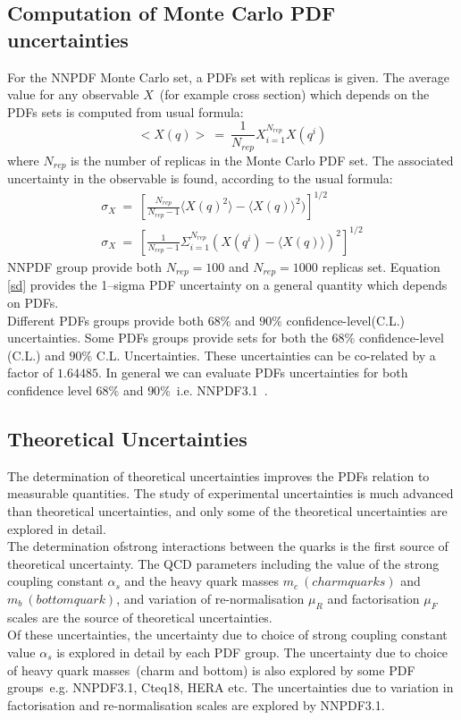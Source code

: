 \subsection{Computation of Monte Carlo PDF uncertainties}
For the NNPDF Monte Carlo set, a PDFs set with replicas is given. The average value for any observable $X$~(for example cross section) which depends on the PDFs sets is computed from usual formula:
\begin{equation}
<X(q)>~=~\frac{1}{N_{rep}}X_{i=1}^{N_{rep}}X(q^{i})
\end{equation}
where $N_{rep}$ is the number of replicas in the Monte Carlo PDF set. The associated uncertainty in the observable is found, according to the usual formula:
\begin{eqnarray}\label{sd}
\sigma_{X}~=~[\frac{N_{rep}}{N_{rep}-1}{\langle X(q)^{2}\rangle -\langle X(q)\rangle ^{2})}]^{1/2}\\
\sigma_{X}~=~[\frac{1}{N_{rep}-1}\Sigma_{i=1}^{N_{rep}}(X(q^{i})-\langle X(q) \rangle)^{2}]^{1/2}
\end{eqnarray}
NNPDF group provide both $N_{rep} = 100 $ and $N_{rep} = 1000$ replicas set. Equation \ref{sd} provides the 1–sigma PDF uncertainty on a general quantity which depends on PDFs.\\
Different PDFs groups provide both $68\%$ and $90\%$ confidence-level(C.L.) uncertainties. Some PDFs groups provide sets for both the $68\%$ confidence-level (C.L.) and $90\%$ C.L. Uncertainties. These uncertainties can be co-related by a factor of $1.64485$. In general we can evaluate PDFs uncertainties for both confidence level $68\%$ and $90\%$~i.e. NNPDF3.1~\cite{Watt_2011}.
\subsection{Theoretical Uncertainties}
The determination of theoretical uncertainties improves the PDFs relation to measurable quantities. The study of experimental uncertainties is much advanced than theoretical uncertainties, and only some of the theoretical uncertainties are explored in detail.\\
The determination ofstrong interactions between the quarks is the first source of theoretical uncertainty. The QCD parameters including the value of the strong coupling constant $\alpha_{s}$ and the heavy quark masses $m_{c}~(charm quarks)$ and $m_{b}~(bottom quark)$, and variation of re-normalisation $\mu_{R}$ and factorisation $\mu_{F}$ scales are the source of theoretical uncertainties.\\
Of these uncertainties, the uncertainty due to choice of strong coupling constant value $\alpha_{s}$ is explored in detail by each PDF group. The uncertainty due to choice of heavy quark masses~(charm and bottom) is also explored by some PDF groups~e.g. NNPDF3.1, Cteq18, HERA etc. The uncertainties due to variation in factorisation and re-normalisation scales are explored by NNPDF3.1.  
